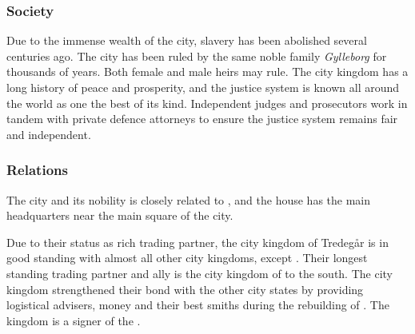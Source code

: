 \subsubsection{Society}

Due to the immense wealth of the city, slavery has been abolished several
centuries ago. The city has been ruled by the same noble family \emph{Gylleborg}
for thousands of years. Both female and male heirs may rule. The city kingdom
has a long history of peace and prosperity, and the justice system is known
all around the world as one the best of its kind. Independent judges and
prosecutors work in tandem with private defence attorneys to ensure the
justice system remains fair and independent.

\subsubsection{Relations}

The city and its nobility is closely related to ,
and the house has the main headquarters near the main square of the city.

Due to their status as rich trading partner, the city kingdom of Tredegår is
in good standing with almost all other city kingdoms, except
.  Their longest standing trading partner and ally is the
city kingdom of  to the south. The city kingdom
strengthened their bond with the other city states by providing logistical
advisers, money and their best smiths during the rebuilding of
. The kingdom is a signer of the .
